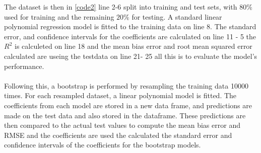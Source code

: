 


\noindent The dataset is then in \autoref{code2} line 2-6 split into training and test sets, with $80\%$ used for training and the remaining $20\%$ for testing. A standard linear polynomial regression model is fitted to the training data on line 8. The standard error, and confidence intervals for the coefficients are calculated on line 11 - 5 the $R^2$ is calculeted on line 18 and  the mean bias error and root mean squared error calculated are useing the testdata on line 21- 25 all this is to evaluate the model's performance.
\\\\



\noindent Following this, a bootstrap is performed by resampling the training data 10000 times. For each resampled dataset, a linear polynomial model is fitted. The coefficients from each model are stored in a new data frame, and predictions are made on the test data and also stored in the dataframe. These predictions are then compared to the actual test values to compute the mean bias error and RMSE and the coefficients are used the calculated the standard error and confidence intervals of the coefficients for the bootstrap models.
\\\\



